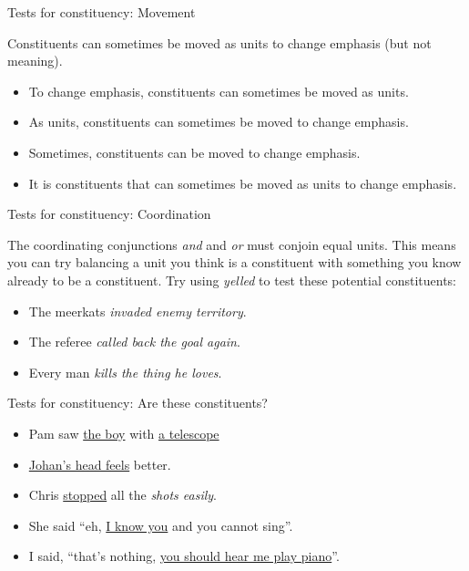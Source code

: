 \documentclass[9pt,xcolor=pdftex,dvipsnames,table]{beamer}
\begin{document}
\begin{frame}{Tests for constituency: Movement}
\begin{center}
     {\large Constituents can sometimes be moved as units to change emphasis (but not meaning). }
\end{center}
\begin{itemize}
     \item To change emphasis, constituents can sometimes be moved as units.
     \item As units, constituents can sometimes be moved to change emphasis.
     \item Sometimes, constituents can be moved to change emphasis.
     \item It is constituents that can sometimes be moved as units to change emphasis.
\end{itemize}
\end{frame}

\begin{frame}{Tests for constituency: Coordination}
\begin{center}
     {\large The coordinating conjunctions \emph{and} and \emph{or} must conjoin equal units.  This means you can try balancing a unit you think is a constituent with something you know already to be a constituent. Try using \emph{yelled} to test these potential constituents: }
\end{center}
\begin{itemize}
     \item The meerkats \emph{invaded enemy territory}. \pause
     \item The referee \emph{called back the goal again}. \pause
     \item Every man \emph{kills the thing he loves}.
\end{itemize}
\end{frame}

\begin{frame}{Tests for constituency: Are these constituents?}
\begin{itemize}
     \item Pam saw \underline{the boy} with \underline{a telescope}
     \item \underline{Johan's head feels} better.
     \item Chris \underline{stopped} all the \emph{shots easily}.
     \item She said ``eh, \underline{I know you} and you cannot sing''.
     \item I said, ``that's nothing, \underline{you should hear me play piano}''. 
\end{itemize}
\end{frame}
\end{document}
